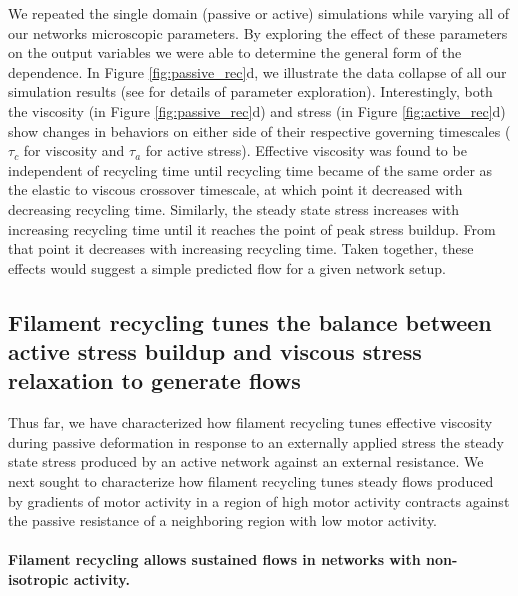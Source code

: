 \documentclass[10pt,letterpaper]{article}
\begin{document}
We repeated the single domain (passive or active) simulations while varying all of our networks microscopic parameters.   By exploring the effect of these parameters on the output variables we were able to determine the general form of the dependence. In Figure \ref{fig:passive_rec}d, we illustrate the data collapse of all our simulation results (see  for details of parameter exploration).  Interestingly, both the viscosity (in Figure \ref{fig:passive_rec}d) and stress (in Figure \ref{fig:active_rec}d) show changes in behaviors on either side of their respective governing timescales ($\tau_c$ for viscosity and $\tau_a$ for active stress).  Effective viscosity was found to be independent of recycling time until recycling time became of the same order as the elastic to viscous crossover timescale, at which point it decreased with decreasing recycling time.  Similarly, the steady state stress increases with increasing recycling time until it reaches the point of peak stress buildup.  From that point it decreases with increasing recycling time.  Taken together, these effects would suggest a simple predicted flow for a given network setup. 







\subsection*{Filament recycling tunes the balance between active stress buildup and viscous stress relaxation to generate flows}

Thus far, we have characterized how filament recycling tunes effective viscosity during passive deformation in response to an externally applied stress the steady state stress produced by an active network against an external resistance.  We next sought to characterize how filament recycling tunes steady flows produced by gradients of motor activity in a region of high motor activity contracts against the passive resistance of a neighboring region with low motor activity.  

\paragraph{Filament recycling allows sustained flows in networks with non-isotropic activity.}
\end{document}
